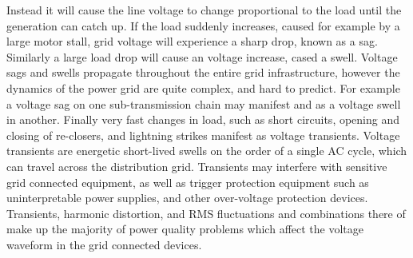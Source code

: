 Instead it will cause the line voltage to change proportional to the load until the generation can catch up. If the load suddenly increases, caused for example by a large motor stall, grid voltage will experience a sharp drop, known as a sag. Similarly a large load drop will cause an voltage increase, cased a swell. Voltage sags and swells propagate throughout the entire grid infrastructure, however the dynamics of the power grid are quite complex, and hard to predict. For example a voltage sag on one sub-transmission chain may manifest and as a voltage swell in another. Finally very fast changes in load, such as short circuits, opening and closing of re-closers, and lightning strikes manifest as voltage transients. Voltage transients are energetic short-lived swells on the order of a single AC cycle, which can travel across the distribution grid. Transients may interfere with sensitive grid connected equipment, as well as trigger protection equipment such as uninterpretable power supplies, and other over-voltage protection devices. Transients, harmonic distortion, and RMS fluctuations and combinations there of make up the majority of power quality problems which affect the voltage waveform in the grid connected devices. \cite{5154067}

